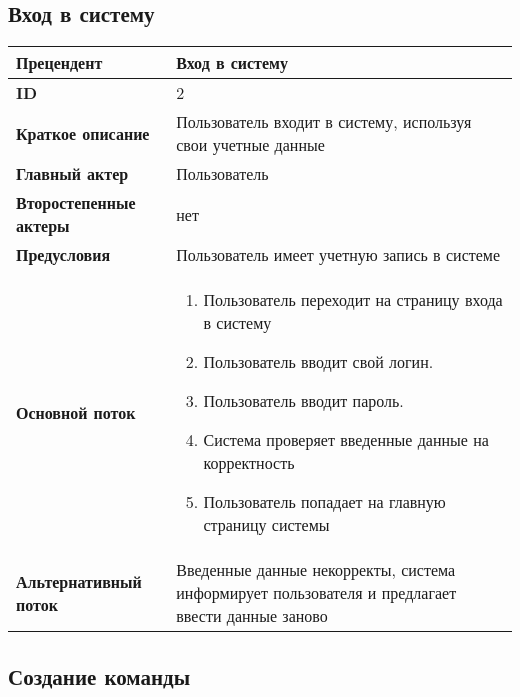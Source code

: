 \documentclass[14pt,a4paper]{extarticle}
\begin{document}
\subsection{Вход в систему}

\begin{tabular}{|l|p{9cm}|}
	\hline
	\textbf{Прецендент}            & Вход в систему                                                                                  \\
	\hline
	\textbf{ID}                    & 2                                                                                               \\
	\hline
	\textbf{Краткое описание}      & Пользователь входит в систему, используя свои учетные данные                                    \\
	\hline
	\textbf{Главный актер}         & Пользователь                                                                                    \\
	\hline
	\textbf{Второстепенные актеры} & нет                                                                                             \\
	\hline
	\textbf{Предусловия}           & Пользователь имеет учетную запись в системе                                                     \\
	\hline
	\textbf{Основной поток}        & \begin{enumerate}
		                                 \item Пользователь переходит на страницу входа в систему
		                                 \item Пользователь вводит свой логин.
		                                 \item Пользователь вводит пароль.
		                                 \item Система проверяет введенные данные на корректность
		                                 \item Пользователь попадает на главную страницу системы
	                                 \end{enumerate}                                         \\
	\hline
	\textbf{Альтернативный поток}  & Введенные данные некорректы, система информирует пользователя и предлагает ввести данные заново \\
	\hline
\end{tabular}

\subsection{Создание команды}
\end{document}
